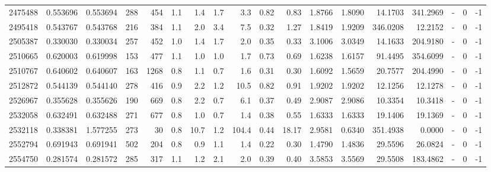 \begin{tabular}{rrrrrrrrrrrrrrrlrr}
   2475488 & 0.553696 &   0.553694 &  288 &  454 &      1.1 &      1.4 &     1.7 &      3.3 &       0.82 &        0.83 &  1.8766 &  1.8090 &   14.1703 &  341.2969 &             - &        0 &         -1 \\
   2495418 & 0.543767 &   0.543768 &  216 &  384 &      1.1 &      2.0 &     3.4 &      7.5 &       0.32 &        1.27 &  1.8419 &  1.9209 &  346.0208 &   12.2152 &             - &        0 &         -1 \\
   2505387 & 0.330030 &   0.330034 &  257 &  452 &      1.0 &      1.4 &     1.7 &      2.0 &       0.35 &        0.33 &  3.1006 &  3.0349 &   14.1633 &  204.9180 &             - &        0 &         -1 \\
   2510665 & 0.620003 &   0.619998 &  153 &  477 &      1.1 &      1.0 &     1.0 &      1.7 &       0.73 &        0.69 &  1.6238 &  1.6157 &   91.4495 &  354.6099 &             - &        0 &         -1 \\
   2510767 & 0.640602 &   0.640607 &  163 & 1268 &      0.8 &      1.1 &     0.7 &      1.6 &       0.31 &        0.30 &  1.6092 &  1.5659 &   20.7577 &  204.4990 &             - &        0 &         -1 \\
   2512872 & 0.544139 &   0.544140 &  278 &  416 &      0.9 &      2.2 &     1.2 &     10.5 &       0.82 &        0.91 &  1.9202 &  1.9202 &   12.1256 &   12.1278 &             - &        0 &         -1 \\
   2526967 & 0.355628 &   0.355626 &  190 &  669 &      0.8 &      2.2 &     0.7 &      6.1 &       0.37 &        0.49 &  2.9087 &  2.9086 &   10.3354 &   10.3418 &             - &        0 &         -1 \\
   2532058 & 0.632491 &   0.632488 &  271 &  677 &      0.8 &      1.0 &     0.7 &      1.4 &       0.38 &        0.55 &  1.6333 &  1.6333 &   19.1406 &   19.1369 &             - &        0 &         -1 \\
   2532118 & 0.338381 &   1.577255 &  273 &   30 &      0.8 &     10.7 &     1.2 &    104.4 &       0.44 &       18.17 &  2.9581 &  0.6340 &  351.4938 &    0.0000 &             - &        0 &         -1 \\
   2552794 & 0.691943 &   0.691941 &  502 &  204 &      0.8 &      0.9 &     1.1 &      1.4 &       0.22 &        0.30 &  1.4790 &  1.4836 &   29.5596 &   26.0824 &             - &        0 &         -1 \\
   2554750 & 0.281574 &   0.281572 &  285 &  317 &      1.1 &      1.2 &     2.1 &      2.0 &       0.39 &        0.40 &  3.5853 &  3.5569 &   29.5508 &  183.4862 &             - &        0 &         -1 \\

\end{tabular}
